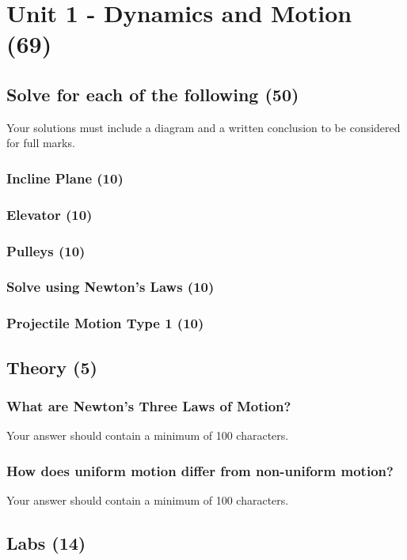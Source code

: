 \documentclass{article}
\begin{document}
\section{Unit 1 - Dynamics and Motion (69)}
\subsection{Solve for each of the following (50)}
Your solutions must include a diagram and a written conclusion to be considered for full marks.

\subsubsection{Incline Plane (10)}
\subsubsection{Elevator (10)}
\subsubsection{Pulleys (10)}
\subsubsection{Solve using Newton's Laws (10)}
\subsubsection{Projectile Motion Type 1 (10)}

\subsection{Theory (5)}
\subsubsection{What are Newton's Three Laws of Motion?}
Your answer should contain a minimum of 100 characters.

\subsubsection{How does uniform motion differ from non-uniform motion?}
Your answer should contain a minimum of 100 characters.

\subsection{Labs (14)}
\end{document}
